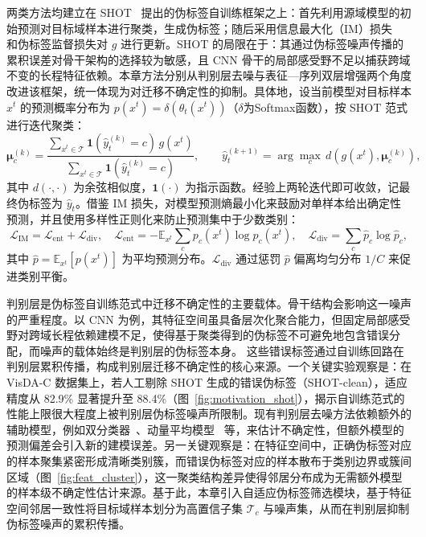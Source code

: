 两类方法均建立在 SHOT~\cite{liang2021source} 提出的伪标签自训练框架之上：首先利用源域模型的初始预测对目标域样本进行聚类，生成伪标签；随后采用信息最大化（IM）损失~\cite{gomes2010discriminative} 和伪标签监督损失对 $g$ 进行更新。SHOT 的局限在于：其通过伪标签噪声传播的累积误差对骨干架构的选择较为敏感，且 CNN 骨干的局部感受野不足以捕获跨域不变的长程特征依赖。本章方法分别从判别层去噪与表征—序列双层增强两个角度改进该框架，统一体现为对迁移不确定性的抑制。具体地，设当前模型对目标样本 $x^t$ 的预测概率分布为 $p(x^t) = \delta(\theta_t(x^t))$（$\delta$为Softmax函数），按 SHOT 范式进行迭代聚类：
\begin{equation}
\boldsymbol{\mu}^{(k)}_c = \frac{\sum_{x^t \in \mathcal{T}} \mathbf{1}(\hat{y}^{(k)}_t = c) \, g(x^t)}{\sum_{x^t \in \mathcal{T}} \mathbf{1}(\hat{y}^{(k)}_t = c)}, \qquad
\hat{y}^{(k+1)}_t = \arg\max_c \, d\!\left(g(x^t), \boldsymbol{\mu}^{(k)}_c\right),
\label{eq:chap2_proto}
\end{equation}
其中 $d(\cdot, \cdot)$ 为余弦相似度，$\mathbf{1}(\cdot)$ 为指示函数。经验上两轮迭代即可收敛，记最终伪标签为 $\hat{y}_t$。借鉴 IM 损失，对模型预测熵最小化来鼓励对单样本给出确定性预测，并且使用多样性正则化来防止预测集中于少数类别：
\begin{equation}
\mathcal{L}_{\text{IM}} = \mathcal{L}_{\text{ent}} + \mathcal{L}_{\text{div}}, \quad
\mathcal{L}_{\text{ent}} = -\mathbb{E}_{x^t} \sum_c p_c(x^t) \log p_c(x^t), \quad
\mathcal{L}_{\text{div}} = \sum_c \hat{p}_c \log \hat{p}_c,
\label{eq:chap2_im}
\end{equation}
其中 $\hat{p} = \mathbb{E}_{x^t}[p(x^t)]$ 为平均预测分布。$\mathcal{L}_{\text{div}}$ 通过惩罚 $\hat{p}$ 偏离均匀分布 $1/C$ 来促进类别平衡。

判别层是伪标签自训练范式中迁移不确定性的主要载体。骨干结构会影响这一噪声的严重程度。以 CNN 为例，其特征空间虽具备层次化聚合能力，但固定局部感受野对跨域长程依赖建模不足，使得基于聚类得到的伪标签不可避免地包含错误分配，而噪声的载体始终是判别层的伪标签本身。
这些错误标签通过自训练回路在判别层累积传播，构成判别层迁移不确定性的核心来源。一个关键实验观察是：在 VisDA-C 数据集上，若人工剔除 SHOT 生成的错误伪标签（SHOT-clean），适应精度从 82.9\% 显著提升至 88.4\%（图~\ref{fig:motivation_shot}），揭示自训练范式的性能上限很大程度上被判别层伪标签噪声所限制。现有判别层去噪方法依赖额外的辅助模型，例如双分类器~\cite{liang2021source}、动量平均模型~\cite{tarvainen2017mean} 等，来估计不确定性，但额外模型的预测偏差会引入新的建模误差。另一关键观察是：在特征空间中，正确伪标签对应的样本聚集紧密形成清晰类别簇，而错误伪标签对应的样本散布于类别边界或簇间区域（图~\ref{fig:feat_cluster}），这一聚类结构差异使得邻居分布成为无需额外模型的样本级不确定性估计来源。基于此，本章引入自适应伪标签筛选模块，基于特征空间邻居一致性将目标域样本划分为高置信子集 $\mathcal{T}_c$ 与噪声集，从而在判别层抑制伪标签噪声的累积传播。

